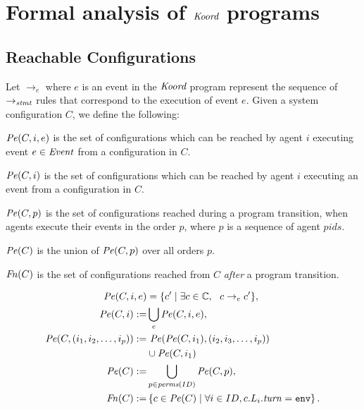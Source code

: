 \section{Formal analysis of $\emph{Koord}$ programs}
\label{sec:verification}

\subsection{Reachable Configurations}
Let $\rightarrow_{e}$ where $e$ is an event in the $\emph{Koord}$ program represent the sequence of $\rightarrow_\mathit{stmt}$ rules that correspond to the execution of event $e$. Given a system configuration $C$, we define the following:
 \begin{inparaenum}[(i)]
     \item $\mathit{Pe}(C,i,e)$ is the set of configurations which can be reached by agent $i$ executing event $e \in \mathit{Event}$ from a configuration in $C$.
     \item$\mathit{Pe}(C,i)$ is the set of configurations which can be reached by agent $i$ executing an event from a configuration in $C$.
     \item$\mathit{Pe}(C,p)$ is the set of configurations reached during a program transition, when agents execute their events in the order $p$, where $p$ is a sequence of agent $\mathit{pids}$.
     \item $\mathit{Pe}(C)$ is the union of $\mathit{Pe}(C,p)$ over all orders $p$.
     \item$\mathit{Fn}(C)$ is the set of configurations reached from $C$ \emph{after} a program transition.
 \end{inparaenum}
\vspace{1mm}
\begin{mdframed}
\footnotesize
\begin{align*}
    \Post (C,i,e) &= \{ c^\prime\mid \exists c\in \pwg,  \ \ c\rightarrow_{e} c^\prime \},\\
\Post(C,i) :=& \bigcup_e \Post(C,i,e),\\
\Post(C,(i_1,i_2,\ldots ,i_p)) := & \ \Post(\Post(C,i_1),(i_2,i_3,\ldots,i_p))\\ & \cup \Post(C,i_1)\\
\Post(C) :=& \bigcup_{p\in \mathit{perms}(\UINS)} \Post(C,p), \\
\Final(C) :=& \left\{ c\in \Post(C)\mid \forall i \in \UINS, c.L_i.\turn = \env \right\}.
\end{align*}
\end{mdframed}

